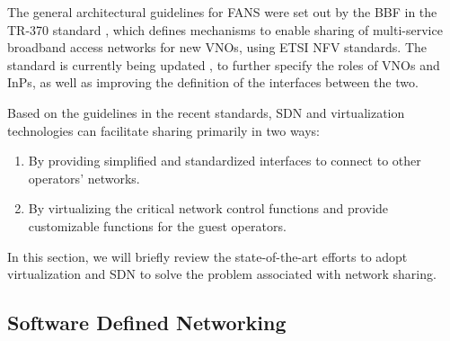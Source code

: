 The general architectural guidelines for \ac{FANS} were set out by the \ac{BBF} in the TR-370 standard \cite{bbf370}, which defines mechanisms to enable sharing of multi-service broadband access networks for new \acp{VNO}, using \ac{ETSI} \ac{NFV} standards. The standard is currently being updated \cite{bbf370i2}, to further specify the roles of \acp{VNO} and \acp{InP}, as well as improving the definition of the interfaces between the two.


Based on the guidelines in the recent standards, \ac{SDN} and virtualization technologies can facilitate sharing primarily in two ways: 
\begin{enumerate}
    \item By providing simplified and standardized interfaces to connect to other operators' networks.
    \item By virtualizing the critical network control functions and provide customizable functions for the guest operators.
\end{enumerate}

In this section, we will briefly review the state-of-the-art efforts to adopt virtualization and \ac{SDN} to solve the problem associated with network sharing.

\subsection{Software Defined Networking}

